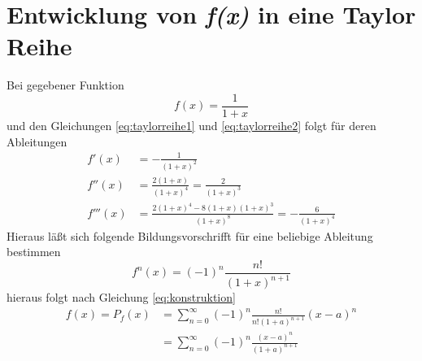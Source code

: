 \section{Entwicklung von \emph{f(x)} in eine Taylor Reihe}
Bei gegebener Funktion
\begin{equation}
    f\left(x\right) = \frac{1}{1+x}
\end{equation}
und den Gleichungen \ref{eq:taylorreihe1} und \ref{eq:taylorreihe2} folgt für deren Ableitungen
\begin{align}
    f'\left(x\right)    &= -\frac{1}{\left(1+x\right)^2} \\
    f''\left(x\right)   &=  \frac{2\left(1+x\right)}{\left(1+x\right)^4}
                         =  \frac{2}{\left(1+x\right)^3} \\
    f'''\left(x\right)  &=  \frac{2\left(1+x\right)^4 -8\left(1+x\right)\left(1+x\right)^3}
                            {\left(1+x\right)^8}
                         =  -\frac{6}{\left(1+x\right)^4}
\end{align}
Hieraus läßt sich folgende Bildungsvorschrifft für eine beliebige Ableitung bestimmen
\begin{equation}
    f^n\left(x\right) = \left(-1\right)^n \frac{n!}{\left(1+x\right)^{n+1}}
\end{equation}
hieraus folgt nach Gleichung \ref{eq:konstruktion}
\begin{align}
    f\left(x\right)  =  P_f\left(x\right) 
                    &= \sum_{n=0}^{\infty} \left(-1\right)^n
                        \frac{n!}{n!\left(1+a\right)^{n+1}}\left(x-a\right)^n\\
                    &=  \sum_{n=0}^{\infty} \left(-1\right)^n
                        \frac{\left(x-a\right)^n}{\left(1+a\right)^{n+1}}
\end{align}